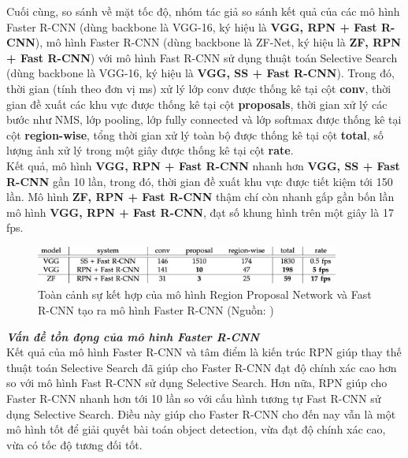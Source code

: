 {    Cuối cùng, so sánh về mặt tốc độ, nhóm tác giả so sánh kết quả của các mô hình Faster R-CNN (dùng backbone là VGG-16, ký hiệu là \textbf{VGG, RPN + Fast R-CNN}), mô hình Faster R-CNN (dùng backbone là ZF-Net, ký hiệu là \textbf{ZF, RPN + Fast R-CNN}) với mô hình Fast R-CNN sử dụng thuật toán Selective Search (dùng backbone là VGG-16, ký hiệu là \textbf{VGG, SS + Fast R-CNN}).
    Trong đó, thời gian (tính theo đơn vị ms) xử lý lớp conv được thống kê tại cột \textbf{conv}, thời gian đề xuất các khu vực được thống kê tại cột \textbf{proposals}, thời gian xử lý các bước như NMS, lớp pooling, lớp fully connected và lớp softmax được thống kê tại cột \textbf{region-wise}, tổng thời gian xử lý toàn bộ được thống kê tại cột \textbf{total}, số lượng ảnh xử lý trong một giây được thống kê tại cột \textbf{rate}. \\
    Kết quả, mô hình \textbf{VGG, RPN + Fast R-CNN} nhanh hơn \textbf{VGG, SS + Fast R-CNN} gần 10 lần, trong đó, thời gian đề xuất khu vực được tiết kiệm tới 150 lần.
    Mô hình \textbf{ZF, RPN + Fast R-CNN} thậm chí còn nhanh gấp gần bốn lần mô hình \textbf{VGG, RPN + Fast R-CNN}, đạt số khung hình trên một giây là 17 fps.

    \begin{figure}[H]
        \centering
        \includegraphics[width=10cm] {images/faster_rcnn_results_4}
        \caption{Toàn cảnh sự kết hợp của mô hình Region Proposal Network và Fast R-CNN tạo ra mô hình Faster R-CNN (Nguồn: \cite{ren2015faster})}
        \label{fig:faster_rcnn_results_4}
    \end{figure}

    \noindent
    \textbf{\textit{Vấn đề tồn đọng của mô hình Faster R-CNN}} \\
    Kết quả của mô hình Faster R-CNN và tâm điểm là kiến trúc RPN giúp thay thế thuật toán Selective Search đã giúp cho Faster R-CNN đạt độ chính xác cao hơn so với mô hình Fast R-CNN sử dụng Selective Search.
    Hơn nữa, RPN giúp cho Faster R-CNN nhanh hơn tới 10 lần so với cấu hình tương tự Fast R-CNN sử dụng Selective Search.
    Điều này giúp cho Faster R-CNN cho đến nay vẫn là một mô hình tốt để giải quyết bài toán object detection, vừa đạt độ chính xác cao, vừa có tốc độ tương đối tốt.
}